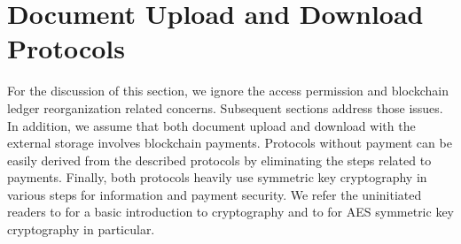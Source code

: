 \section{Document Upload and Download Protocols}
\label{s-updown}
For the discussion of this section, we ignore the access permission and blockchain ledger reorganization related concerns. Subsequent sections address those issues. In addition, we assume that both document upload and download with the external storage involves blockchain payments. Protocols without payment can be easily derived from the described protocols by eliminating the steps related to payments. Finally, both protocols heavily use symmetric key cryptography in various steps for information and payment security. We refer the uninitiated readers to \cite{1455525} for a basic introduction to cryptography and to \cite{Daemen99aesproposal:} for AES symmetric key cryptography in particular. 

